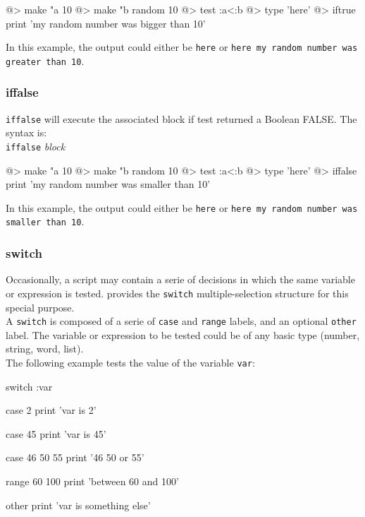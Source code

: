 \begin{verbatimtab}
@> make "a 10 
@> make "b random 10 
@> test :a<:b 
@> type 'here' 
@> iftrue {print 'my random number was bigger than 10'}
\end{verbatimtab}

In this example, the output could either be {\tt here} or {\tt here my random number was greater than 10}.
 
\subsubsection*{iffalse} 
 
{\tt iffalse} will execute the associated block if test returned
a Boolean FALSE. The syntax is:\\
 
{\tt iffalse} {\it block} 
 
\begin{verbatimtab} 
@> make "a 10
@> make "b random 10
@> test :a<:b
@> type 'here'
@> iffalse {print 'my random number was smaller than 10'}
\end{verbatimtab}

In this example, the output could either be {\tt here} or {\tt here my random number was smaller than 10}.
 
\subsubsection*{switch}  

Occasionally, a script may contain a serie of decisions in which the same variable or expression is tested. \squirrel provides the {\tt switch} multiple-selection structure for this special purpose.\\

A {\tt switch} is composed of a serie of {\tt case} and {\tt range} labels, and an optional {\tt other} label. The variable or expression to be tested could be of any basic type (number, string, word, list).\\

The following example tests the value of the variable {\tt var}:

\begin{verbatimtab} 
switch :var {
	
	case 2 {
		print 'var is 2'	
	}
	
	case 45 {
		print 'var is 45'	
	}
	
	case 46 50 55 {
		print '46 50 or 55'	
	}

	range 60 100 {
		print 'between 60 and 100'		
	}
	
	other {
		print 'var is something else'		
	}	
}
\end{verbatimtab} 


